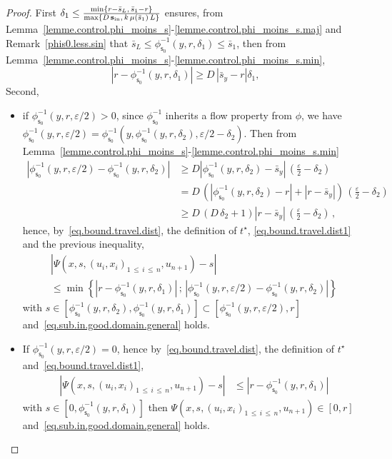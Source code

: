 \documentclass[AHL,Unicode,longabstracts,published]{cedram}
\newcommand{\Sin}{{\mathbf s}_{\textrm{\tiny\rm in}}}
\newcommand{\barmu}{\mu(\bar s_1)}
\newcommand{\ens}[2]{\left[#1,#2\right]}
\newcommand{\phis}{\phi_{\textsf{s}_0}^{-1}}
\newcommand{\1}{\mathbf{1}}
\begin{document}
\begin{proof}
First $\delta_1\leq \frac{\min\{r-\bar s_L,\, \bar s_1-r\}}{\max\{D\,\Sin,\, k\,\barmu\,L\}}$ ensures, from Lemma~\ref{lemme.control.phi_moins_s}-\ref{lemme.control.phi_moins_s.maj} and Remark~\ref{phis0.less.sin} that $\bar s_L\leq\phis(y,r,\delta_1)\leq\bar s_1$, then from Lemma~\ref{lemme.control.phi_moins_s}-\ref{lemme.control.phi_moins_s.min},
\begin{equation}\label{eq.bound.travel.dist1}
\left|r-\phis(y,r,\delta_1)\right| \geq D\, \left|\bar s_y-r\right|\delta_1,
\end{equation}
Second,
\begin{itemize}
\item if $\phis(y,r, \varepsilon/2)>0$, since $\phis$ inherits a flow property from $\phi$, we have $\phis(y,r, \varepsilon/2) = \phis(y,\phis(y,r, \delta_2), \varepsilon/2-\delta_2)$. Then from Lemma~\ref{lemme.control.phi_moins_s}-\ref{lemme.control.phi_moins_s.min}
\begin{align*}
\left|\phis(y, r, \varepsilon/2) - \phis(y,r, \delta_2)\right| & \geq D\left|\phis(y, r, \delta_2) - \bar s_y\right|\,\left(\frac{\varepsilon}{2}-\delta_2\right)
\\
& = D\,\left(\left|\phis(y,r, \delta_2) - r\right| + |r- \bar s_y|\right)\,\left(\frac{\varepsilon}{2}-\delta_2\right)
\\
& \geq D\,(D\,\delta_2+1)|r- \bar s_y|\,\left(\frac{\varepsilon}{2}-\delta_2\right)\,,
\end{align*}
hence, by~\eqref{eq.bound.travel.dist}, the definition of $t^\star$, \eqref{eq.bound.travel.dist1} and the previous inequality,
\begin{multline*}
\left|\Psi(x,s,(u_i,x_i)_{1\,\leq\,i\,\leq\,n},u_{n+1})-s\right|
\\
\leq \min\left\{\left|r-\phis(y,r,\delta_1)\right|\,;\,\left|\phis(y, r, \varepsilon/2) - \phis(y,r, \delta_2)\right| \right\}
\end{multline*}
with $s\in [\phis(y,r,\delta_2), \phis(y,r,\delta_1)] \subset [\phis(y,r,\varepsilon/2),r]$ and~\eqref{eq.sub.in.good.domain.general} holds.

\item If $\phis(y,r, \varepsilon/2)=0$, hence by~\eqref{eq.bound.travel.dist}, the definition of $t^\star$ and~\eqref{eq.bound.travel.dist1},
\begin{align*}
\left|\Psi(x,s,(u_i,x_i)_{1\,\leq\,i\,\leq\,n},u_{n+1})-s\right| &\leq \left|r-\phis(y,r,\delta_1)\right|
\end{align*}
with $s\in [0,\phis(y,r,\delta_1)]$ then $\Psi(x,s,(u_i,x_i)_{1\,\leq\,i\,\leq\,n},u_{n+1})\in \ens{0}{r}$ and~\eqref{eq.sub.in.good.domain.general} holds.
\end{itemize}



\end{proof}
\end{document}
